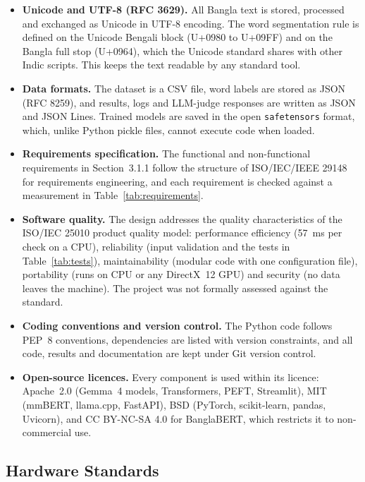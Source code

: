 \begin{itemize}
  \item \textbf{Unicode and UTF-8 (RFC 3629).} All Bangla text is stored,
  processed and exchanged as Unicode in UTF-8 encoding. The word segmentation
  rule is defined on the Unicode Bengali block (U+0980 to U+09FF) and on the
  Bangla full stop (U+0964), which the Unicode standard shares with other
  Indic scripts. This keeps the text readable by any standard tool.
  \item \textbf{Data formats.} The dataset is a CSV file, word labels are stored
  as JSON (RFC 8259), and results, logs and LLM-judge responses are written as
  JSON and JSON Lines. Trained models are saved in the open
  \texttt{safetensors} format, which, unlike Python pickle files, cannot execute
  code when loaded.
  \item \textbf{Requirements specification.} The functional and non-functional
  requirements in Section~3.1.1 follow the structure of ISO/IEC/IEEE 29148 for
  requirements engineering, and each requirement is checked against a
  measurement in Table~\ref{tab:requirements}.
  \item \textbf{Software quality.} The design addresses the quality
  characteristics of the ISO/IEC 25010 product quality model: performance
  efficiency (57~ms per check on a CPU), reliability (input validation and the
  tests in Table~\ref{tab:tests}), maintainability (modular code with one
  configuration file), portability (runs on CPU or any DirectX~12 GPU) and
  security (no data leaves the machine). The project was not formally assessed
  against the standard.
  \item \textbf{Coding conventions and version control.} The Python code follows
  PEP~8 conventions, dependencies are listed with version constraints, and all
  code, results and documentation are kept under Git version control.
  \item \textbf{Open-source licences.} Every component is used within its
  licence: Apache~2.0 (Gemma~4 models, Transformers, PEFT, Streamlit), MIT
  (mmBERT, llama.cpp, FastAPI), BSD (PyTorch, scikit-learn, pandas, Uvicorn),
  and CC BY-NC-SA 4.0 for BanglaBERT, which restricts it to non-commercial use.
\end{itemize}

\subsection{Hardware Standards}

